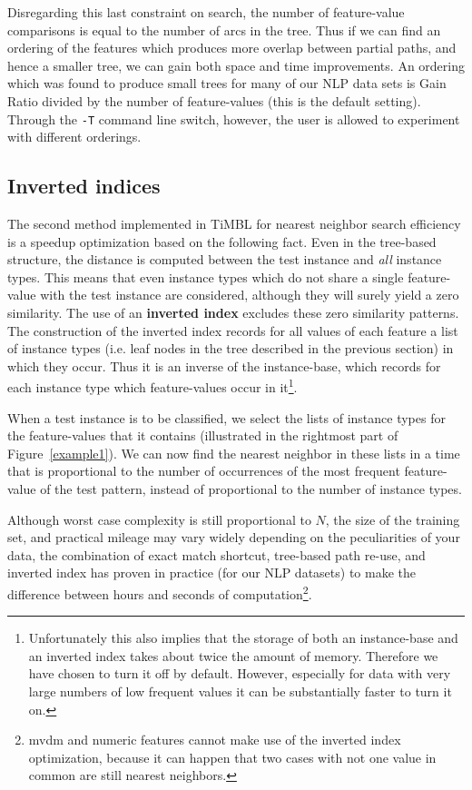 \documentclass{report}
\begin{document}
Disregarding this last constraint on search, the number of feature-value
comparisons is equal to the number of arcs in the tree. Thus if we can
find an ordering of the features which produces more overlap between
partial paths, and hence a smaller tree, we can gain both space and
time improvements. An ordering which was found to produce small trees
for many of our NLP data sets is Gain Ratio divided by the number of
feature-values (this is the default setting). Through the {\tt -T}
command line switch, however, the user is allowed to experiment with
different orderings.

\subsection{Inverted indices}

The second method implemented in TiMBL for nearest neighbor search
efficiency is a speedup optimization based on the following fact. Even
in the tree-based structure, the distance is computed between the test
instance and {\em all} instance types. This means that even instance
types which do not share a single feature-value with the test instance
are considered, although they will surely yield a zero similarity. The
use of an {\bf inverted index} excludes these zero similarity
patterns.  The construction of the inverted index records for all
values of each feature a list of instance types (i.e. leaf nodes in
the tree described in the previous section) in which they occur. Thus
it is an inverse of the instance-base, which records for each instance
type which feature-values occur in it\footnote{Unfortunately this also
implies that the storage of both an instance-base and an inverted
index takes about twice the amount of memory. Therefore we have chosen
to turn it off by default. However, especially for data with very
large numbers of low frequent values it can be substantially faster to
turn it on.}.

When a test instance is to be classified, we select the lists of
instance types for the feature-values that it contains (illustrated in
the rightmost part of Figure~\ref{example1}). We can now find the
nearest neighbor in these lists in a time that is proportional to the
number of occurrences of the most frequent feature-value of the test
pattern, instead of proportional to the number of instance types.

Although worst case complexity is still proportional to $N$, the size
of the training set, and practical mileage may vary widely depending
on the peculiarities of your data, the combination of exact match
shortcut, tree-based path re-use, and inverted index has proven in
practice (for our NLP datasets) to make the difference between hours
and seconds of computation\footnote{{\sc mvdm} and numeric features
cannot make use of the inverted index optimization, because it can
happen that two cases with not one value in common are still nearest
neighbors.}.
\end{document}
